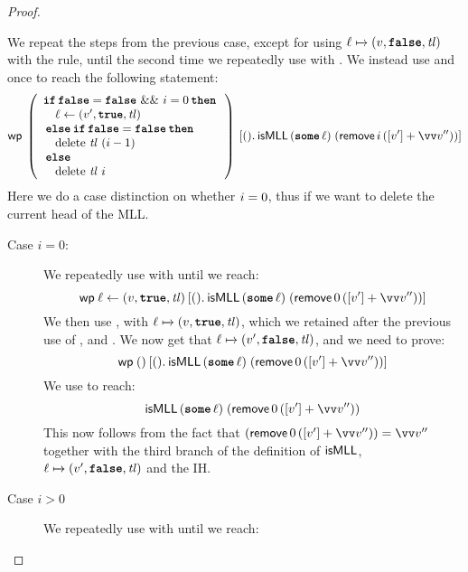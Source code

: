 \documentclass[thesis.tex]{subfiles}
\begin{document}
\begin{proof}
\begin{description}
      We repeat the steps from the previous case, except for using $\loc \fmapsto (\val, \False, \langv{tl})$ with the  rule, until the second time we repeatedly use  with . We instead use  and  once to reach the following statement:
      \[
        \wpre{\left(
          \begin{array}{l}
              \If \False = \False\ \&\&\ \iindex = 0 then \\
              \quad \loc \gets (\val', \True, \langv{tl}) \\
              \Else \If \False = \False then              \\
              \quad \MLLdelete\,\langv{tl}\ (\iindex - 1) \\
              \Else                                       \\
              \quad \MLLdelete\,\langv{tl}\ \iindex
            \end{array}
          \right)}{\Ret(). \textlog{isMLL}\, (\Some \loc)\; (\textlog{remove}\, \iindex\, ([\val'] + \vect{\val}''))}
      \]
      Here we do a case distinction on whether $i = 0$, thus if we want to delete the current head of the MLL.
      \begin{description}
        \item[Case $i = 0$:] We repeatedly use  with  until we reach:
          \[
            \wpre{\loc \gets (\val, \True, \langv{tl})}{\Ret(). \textlog{isMLL}\, (\Some \loc)\; (\textlog{remove}\, 0\, ([\val'] + \vect{\val}''))}
          \]
          We then use ,  with $\loc \fmapsto (\val, \True, \langv{tl})$, which we retained after the previous use of , and . We now get that $\loc \fmapsto (\val', \False, \langv{tl})$, and we need to prove:
          \[
            \wpre{()}{\Ret(). \textlog{isMLL}\, (\Some \loc)\; (\textlog{remove}\, 0\, ([\val'] + \vect{\val}''))}
          \]
          We use  to reach:
          \[
            \textlog{isMLL}\, (\Some \loc)\; (\textlog{remove}\, 0\, ([\val'] + \vect{\val}''))
          \]
          This now follows from the fact that $(\textlog{remove}\, 0\, ([\val'] + \vect{\val}'')) = \vect{\val}''$ together with the third branch of the definition of $\textsf{\upshape isMLL}$, $\loc \fmapsto (\val', \False, \langv{tl})$ and the IH.
        \item[Case $i > 0$] We repeatedly use  with  until we reach:

\end{description}
\end{description}
\end{proof}
\end{document}
